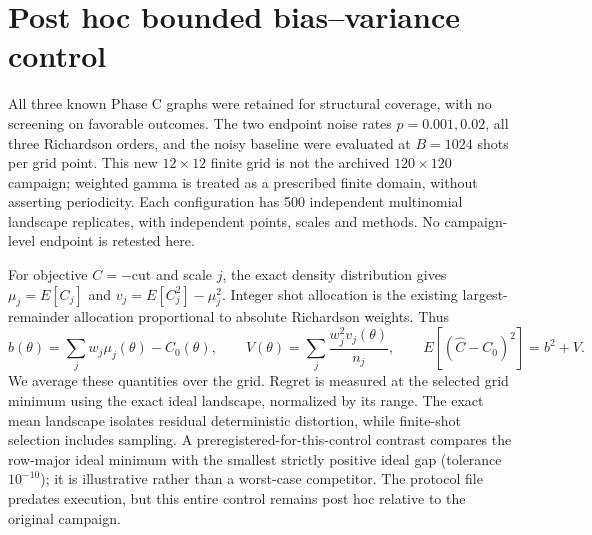 \documentclass{article}
\begin{document}
\section*{Post hoc bounded bias--variance control}
All three known Phase C graphs were retained for structural coverage, with no screening on favorable outcomes. The two endpoint noise rates $p=0.001,0.02$, all three Richardson orders, and the noisy baseline were evaluated at $B=1024$ shots per grid point. This new $12\times12$ finite grid is not the archived $120\times120$ campaign; weighted gamma is treated as a prescribed finite domain, without asserting periodicity. Each configuration has 500 independent multinomial landscape replicates, with independent points, scales and methods. No campaign-level endpoint is retested here.

For objective $C=-\mathrm{cut}$ and scale $j$, the exact density distribution gives $\mu_j=E[C_j]$ and $v_j=E[C_j^2]-\mu_j^2$. Integer shot allocation is the existing largest-remainder allocation proportional to absolute Richardson weights. Thus
\[b(\theta)=\sum_jw_j\mu_j(\theta)-C_0(\theta),\qquad V(\theta)=\sum_j\frac{w_j^2v_j(\theta)}{n_j},\qquad E[(\widehat C-C_0)^2]=b^2+V.\]
We average these quantities over the grid. Regret is measured at the selected grid minimum using the exact ideal landscape, normalized by its range. The exact mean landscape isolates residual deterministic distortion, while finite-shot selection includes sampling. A preregistered-for-this-control contrast compares the row-major ideal minimum with the smallest strictly positive ideal gap (tolerance $10^{-10}$); it is illustrative rather than a worst-case competitor. The protocol file predates execution, but this entire control remains post hoc relative to the original campaign.
\end{document}
